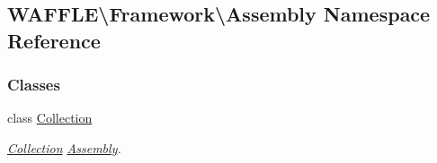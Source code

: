 \hypertarget{namespace_w_a_f_f_l_e_1_1_framework_1_1_assembly}{}\subsection{W\+A\+F\+F\+LE\textbackslash{}Framework\textbackslash{}Assembly Namespace Reference}
\label{namespace_w_a_f_f_l_e_1_1_framework_1_1_assembly}
\subsubsection*{Classes}
\begin{DoxyCompactItemize}
\item 
class \hyperlink{class_w_a_f_f_l_e_1_1_framework_1_1_assembly_1_1_collection}{Collection}
\begin{DoxyCompactList}\small\item\em \hyperlink{class_w_a_f_f_l_e_1_1_framework_1_1_assembly_1_1_collection}{Collection} \hyperlink{namespace_w_a_f_f_l_e_1_1_framework_1_1_assembly}{Assembly}. \end{DoxyCompactList}\end{DoxyCompactItemize}
